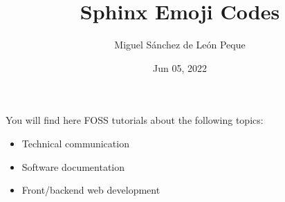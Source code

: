 \documentclass[letterpaper,10pt,english]{sphinxmanual}
\title{Sphinx Emoji Codes}
\date{Jun 05, 2022}
\author{Miguel Sánchez de León Peque}
\begin{document}
\pagestyle{empty}
\sphinxmaketitle
\pagestyle{plain}
\sphinxtableofcontents
\pagestyle{normal}
\label{\detokenize{index::doc}}


\sphinxAtStartPar
You will find here FOSS tutorials about the following topics:
\begin{itemize}
\item {} 
\sphinxAtStartPar
Technical communication

\item {} 
\sphinxAtStartPar
Software documentation

\item {} 
\sphinxAtStartPar
Front/backend web development

\end{itemize}

\sphinxAtStartPar
{}
\end{document}
